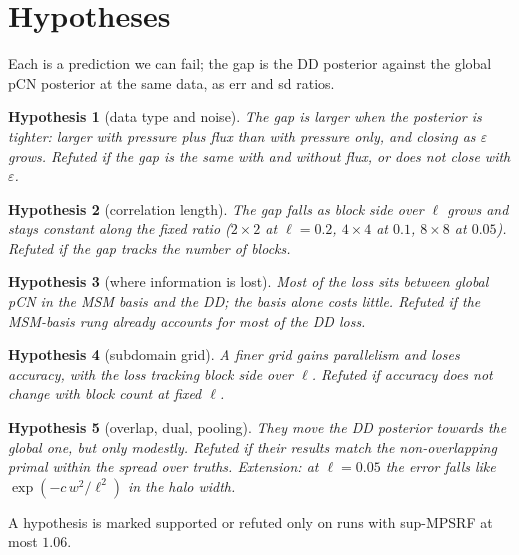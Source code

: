 \documentclass[11pt]{article}
\newtheorem{hyp}{Hypothesis}
\begin{document}
\section{Hypotheses}\label{sec:hyp}
Each is a prediction we can fail; the gap is the DD posterior against the global pCN posterior at the same data, as err and sd ratios.
\begin{hyp}[data type and noise]\label{h1} The gap is larger when the posterior is tighter: larger with pressure plus flux than with pressure only, and closing as $\varepsilon$ grows. Refuted if the gap is the same with and without flux, or does not close with $\varepsilon$.\end{hyp}
\begin{hyp}[correlation length]\label{h2} The gap falls as block side over $\ell$ grows and stays constant along the fixed ratio ($2\times2$ at $\ell=0.2$, $4\times4$ at $0.1$, $8\times8$ at $0.05$). Refuted if the gap tracks the number of blocks.\end{hyp}
\begin{hyp}[where information is lost]\label{h3} Most of the loss sits between global pCN in the MSM basis and the DD; the basis alone costs little. Refuted if the MSM-basis rung already accounts for most of the DD loss.\end{hyp}
\begin{hyp}[subdomain grid]\label{h4} A finer grid gains parallelism and loses accuracy, with the loss tracking block side over $\ell$. Refuted if accuracy does not change with block count at fixed $\ell$.\end{hyp}
\begin{hyp}[overlap, dual, pooling]\label{h5} They move the DD posterior towards the global one, but only modestly. Refuted if their results match the non-overlapping primal within the spread over truths. Extension: at $\ell=0.05$ the error falls like $\exp(-c\,w^2/\ell^2)$ in the halo width.\end{hyp}
A hypothesis is marked supported or refuted only on runs with sup-MPSRF at most $1.06$.

\end{document}
